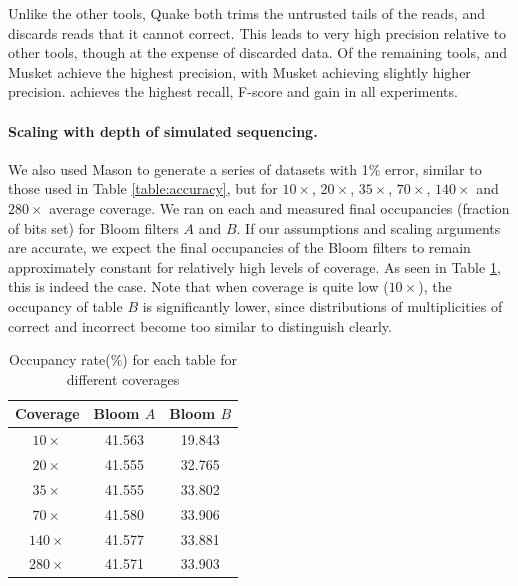 \documentclass[10pt]{article}
\begin{document}
Unlike the other tools, Quake both trims the untrusted tails of the reads, and discards reads that it cannot correct.  This leads to very high precision relative to other tools, though at the expense of discarded data.  Of the remaining tools, \tool and Musket achieve the highest precision, with Musket achieving slightly higher precision.  \tool achieves the highest recall, F-score and gain in all experiments.

\paragraph{Scaling with depth of simulated sequencing.} We also used Mason to generate a series of datasets with 1\% error, similar to those used in Table \ref{table:accuracy}, but for $10\times$, $20\times$, $35\times$, $70\times$, $140\times$ and $280\times$ average coverage.  We ran \tool on each and measured final occupancies (fraction of bits set) for Bloom filters $A$ and $B$.  If our assumptions and scaling arguments are accurate, we expect the final occupancies of the Bloom filters to remain approximately constant for relatively high levels of coverage.  As seen in Table \ref{table:bloom_occupancy_coverage}, this is indeed the case.  Note that when coverage is quite low ($10\times$), the occupancy of table $B$ is significantly lower, since distributions of multiplicities of correct and incorrect \kmers become too similar to distinguish clearly.



\begin{table}
\centering
\begin{tabular}{|c|c|c|}\hline
Coverage & Bloom $A$ & Bloom $B$ \\ \hline
$10\times$	& 41.563  &	19.843 \\ \hline
$20\times$	& 41.555  &	32.765 \\ \hline
$35\times$ & 41.555	& 33.802 \\ \hline
$70\times$ & 41.580	& 33.906 \\ \hline
$140\times$ & 41.577 & 33.881  \\ \hline
$280\times$ & 41.571 & 33.903 \\ \hline
\end{tabular}
\caption{Occupancy rate(\%) for each table for different coverages\label{table:bloom_occupancy_coverage}}
\end{table}
\end{document}
